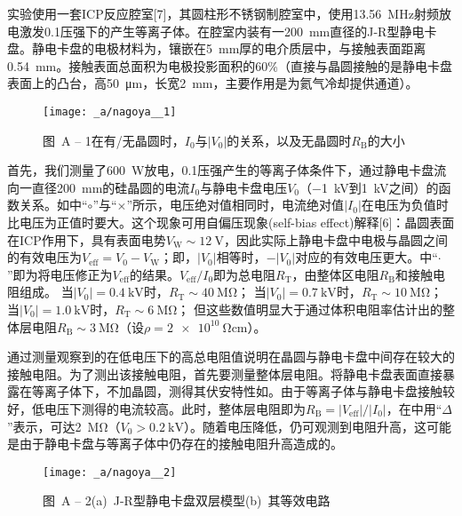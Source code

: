 实验使用一套ICP反应腔室[7]，其圆柱形不锈钢制腔室中，使用\SI{13.56}{\MHz}射频放电激发\SI{0.1}{\torr}压强下的产生等离子体。在腔室内装有一\SI{200}{\mm}直径的J-R型静电卡盘。静电卡盘的电极材料为，镶嵌在\SI{5}{\mm}厚的电介质层中，与接触表面距离\SI{0.54}{\mm}。接触表面总面积为电极投影面积的60\%（直接与晶圆接触的是静电卡盘表面上的凸台，高\SI{50}{\um}，长宽\SI{2}{\mm}，主要作用是为氦气冷却提供通道）。

\begin{figure}[tbhp]
\centering
\texttt{[image: \_a/nagoya\_\_1]}
\caption*{图~A -- 1\hspace{1em}在有/无晶圆时，$I_0$与$\left|V_0\right|$的关系，以及无晶圆时$R_{\mathrm{B}}$的大小}
\end{figure}

首先，我们测量了\SI{600}{\W}放电，\SI{0.1}{\torr}压强产生的等离子体条件下，通过静电卡盘流向一直径\SI{200}{\mm}的硅晶圆的电流$I_0$与静电卡盘电压$V_0$（\SI{-1}{\kV}到\SI{+1}{\kV}之间）的函数关系。如中``$\circ$''与``$\times$''所示，电压绝对值相同时，电流绝对值$\left|I_0\right|$在电压为负值时比电压为正值时要大。这个现象可用自偏压现象(self-bias effect)解释[6]：晶圆表面在ICP作用下，具有表面电势$V_{\mathrm{W}} \sim \SI{12}{\V}$，因此实际上静电卡盘中电极与晶圆之间的有效电压为$V_{\mathrm{eff}} = V_0 - V_{\mathrm{W}}$；即，$\left|V_0\right|$相等时，$-\left|V_0\right|$对应的有效电压更大。中``$\cdot$''即为将电压修正为$V_{\mathrm{eff}}$的结果。$V_{\mathrm{eff}}/I_0$即为总电阻$R_{\mathrm{T}}$，由整体区电阻$R_{\mathrm{B}}$和接触电阻组成。%
当$\left|V_0\right|=\SI{0.4}{\kV}$时，$R_{\mathrm{T}} \sim \SI{40}{\Mohm}$；%
当$\left|V_0\right|=\SI{0.7}{\kV}$时，$R_{\mathrm{T}} \sim \SI{10}{\Mohm}$；%
当$\left|V_0\right|=\SI{1.0}{\kV}$时，$R_{\mathrm{T}} \sim \SI{6}{\Mohm}$；%
但这些数值明显大于通过体积电阻率估计出的整体层电阻$R_{\mathrm{B}} \sim \SI{3}{\Mohm}$（设$\rho=\SI{2e10}{\ohm\cm}$）。

通过测量观察到的在低电压下的高总电阻值说明在晶圆与静电卡盘中间存在较大的接触电阻。为了测出该接触电阻，首先要测量整体层电阻。将静电卡盘表面直接暴露在等离子体下，不加晶圆，测得其伏安特性如。由于等离子体与静电卡盘接触较好，低电压下测得的电流较高。此时，整体层电阻即为$R_{\mathrm{B}}=\left|V_{\mathrm{eff}}\right| / \left|I_0\right|$，在中用``$\Delta$''表示，可达\SI{2}{\Mohm}（$V_0 > \SI{0.2}{\kV}$）。随着电压降低，仍可观测到电阻升高，这可能是由于静电卡盘与等离子体中仍存在的接触电阻升高造成的。

\begin{figure}[tbhp]
\centering
\texttt{[image: \_a/nagoya\_\_2]}
\caption*{图~A -- 2\hspace{1em}(a)\ J-R型静电卡盘双层模型\quad (b)\ 其等效电路}
\end{figure}

